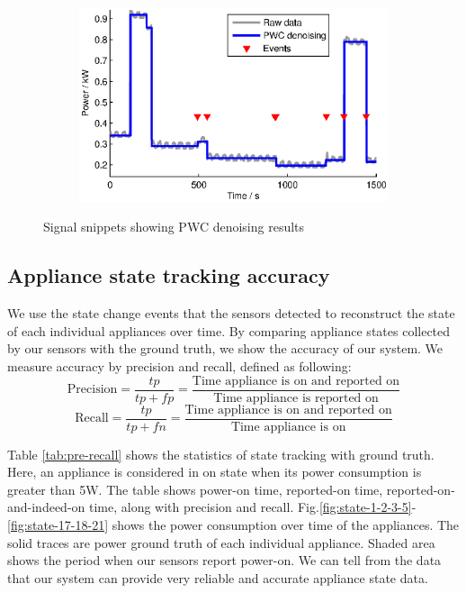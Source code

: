 \begin{figure}[htbp]
\begin{subfigure}[t]{0.47\textwidth}
        \caption{}
    \end{subfigure} 
    \begin{subfigure}[t]{0.47\textwidth}
        \centering
        \includegraphics[width=\textwidth] {../../sw/pc/matlab/pwc-result/4.eps}
        \caption{}
    \end{subfigure} 
    \caption{Signal snippets showing PWC denoising results}\label{fig:pwc-example}
\end{figure}

\subsection{Appliance state tracking accuracy}

We use the state change events that the sensors detected to reconstruct the state of each individual appliances over time. By comparing appliance states collected by our sensors with the ground truth, we show the accuracy of our system. We measure accuracy by precision and recall, defined as following:
\[
\text{Precision} = \frac{tp}{tp+fp} = 
\frac{\text{Time appliance is on and reported on}}
{\text{Time appliance is reported on}}
\]
\[
\text{Recall} = \frac{tp}{tp+fn} = 
\frac{\text{Time appliance is on and reported on}}
{\text{Time appliance is on}}
\]

Table \ref{tab:pre-recall} shows the statistics of state tracking with ground truth. Here, an appliance is considered in on state when its power consumption is greater than 5W. The table shows power-on time, reported-on time, reported-on-and-indeed-on time, along with precision and recall. Fig.\ref{fig:state-1-2-3-5}-\ref{fig:state-17-18-21} shows the power consumption over time of the appliances. The solid traces are power ground truth of each individual appliance. Shaded area shows the period when our sensors report power-on. We can tell from the data that our system can provide very reliable and accurate appliance state data.

